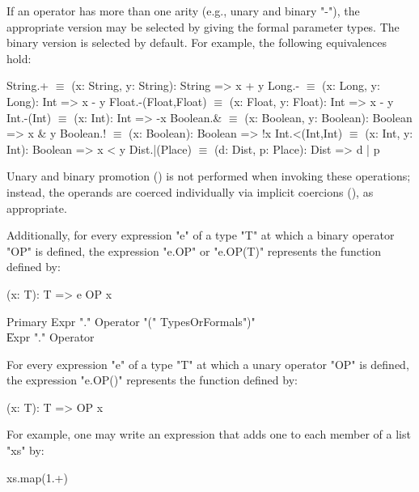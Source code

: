 If an operator has more than one arity (e.g., unary and binary
\xcd"-"), the appropriate version may be selected by giving the
formal parameter types.  The binary version is selected by
default.
For example, the following equivalences hold:

\begin{xtenmath}
String.+             $\equiv$ (x: String, y: String): String => x + y
Long.-               $\equiv$ (x: Long, y: Long): Int => x - y
Float.-(Float,Float) $\equiv$ (x: Float, y: Float): Int => x - y
Int.-(Int)           $\equiv$ (x: Int): Int => -x
Boolean.&            $\equiv$ (x: Boolean, y: Boolean): Boolean => x & y
Boolean.!            $\equiv$ (x: Boolean): Boolean => !x
Int.<(Int,Int)       $\equiv$ (x: Int, y: Int): Boolean => x < y
Dist.|(Place)        $\equiv$ (d: Dist, p: Place): Dist => d | p
\end{xtenmath}

Unary and binary promotion () is not performed
when invoking these
operations; instead, the operands are coerced individually via implicit
coercions (), as appropriate.

Additionally, for every expression \xcd"e" of a type \xcd"T" at which a binary
operator \xcd"OP" is defined, the expression \xcd"e.OP" or
\xcd"e.OP(T)" represents the function
defined by:

\begin{xten}
(x: T): T => { e OP x }
\end{xten}

\begin{grammar}
Primary \: Expr \xcd"." Operator \xcd"(" TypesOrFormals\opt \xcd")" \\
        \| Expr \xcd"." Operator \\
\end{grammar}

For every expression \xcd"e" of a type \xcd"T" at which a unary
operator \xcd"OP" is defined, the expression \xcd"e.OP()" represents the function
defined by:

\begin{xten}
(x: T): T => { OP x }
\end{xten}


For example,
one may write an expression that adds one to each member of a list \xcd"xs" by:

\begin{xten}
xs.map(1.+)
\end{xten}



